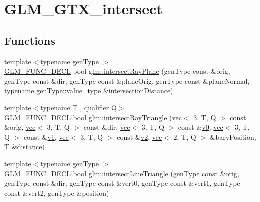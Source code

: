 \hypertarget{group__gtx__intersect}{}\section{G\+L\+M\+\_\+\+G\+T\+X\+\_\+intersect}
\label{group__gtx__intersect}
\subsection*{Functions}
\begin{DoxyCompactItemize}
\item 
{\footnotesize template$<$typename gen\+Type $>$ }\\\hyperlink{setup_8hpp_ab2d052de21a70539923e9bcbf6e83a51}{G\+L\+M\+\_\+\+F\+U\+N\+C\+\_\+\+D\+E\+CL} bool \hyperlink{group__gtx__intersect_gad3697a9700ea379739a667ea02573488}{glm\+::intersect\+Ray\+Plane} (gen\+Type const \&orig, gen\+Type const \&dir, gen\+Type const \&plane\+Orig, gen\+Type const \&plane\+Normal, typename gen\+Type\+::value\+\_\+type \&intersection\+Distance)
\item 
{\footnotesize template$<$typename T , qualifier Q$>$ }\\\hyperlink{setup_8hpp_ab2d052de21a70539923e9bcbf6e83a51}{G\+L\+M\+\_\+\+F\+U\+N\+C\+\_\+\+D\+E\+CL} bool \hyperlink{group__gtx__intersect_ga65bf2c594482f04881c36bc761f9e946}{glm\+::intersect\+Ray\+Triangle} (\hyperlink{structglm_1_1vec}{vec}$<$ 3, T, Q $>$ const \&orig, \hyperlink{structglm_1_1vec}{vec}$<$ 3, T, Q $>$ const \&dir, \hyperlink{structglm_1_1vec}{vec}$<$ 3, T, Q $>$ const \&\hyperlink{_s_d_l__opengl__glext_8h_a7062a23d1d434121d4a88f530703d06a}{v0}, \hyperlink{structglm_1_1vec}{vec}$<$ 3, T, Q $>$ const \&\hyperlink{_s_d_l__opengl__glext_8h_a435c176a02c061b43e19bdf7c86cceae}{v1}, \hyperlink{structglm_1_1vec}{vec}$<$ 3, T, Q $>$ const \&\hyperlink{_s_d_l__opengl__glext_8h_a0928f6d0f0f794ba000a21dfae422136}{v2}, \hyperlink{structglm_1_1vec}{vec}$<$ 2, T, Q $>$ \&bary\+Position, T \&\hyperlink{_s_d_l__opengl__glext_8h_a744fbed01658cb96bb8ba7e85a86d1dc}{distance})
\item 
{\footnotesize template$<$typename gen\+Type $>$ }\\\hyperlink{setup_8hpp_ab2d052de21a70539923e9bcbf6e83a51}{G\+L\+M\+\_\+\+F\+U\+N\+C\+\_\+\+D\+E\+CL} bool \hyperlink{group__gtx__intersect_ga9d29b9b3acb504d43986502f42740df4}{glm\+::intersect\+Line\+Triangle} (gen\+Type const \&orig, gen\+Type const \&dir, gen\+Type const \&vert0, gen\+Type const \&vert1, gen\+Type const \&vert2, gen\+Type \&position)

\end{DoxyCompactItemize}

